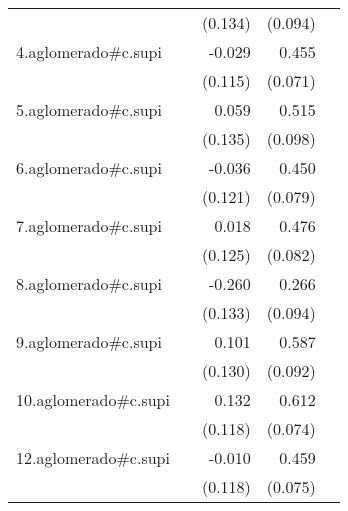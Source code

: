 {\begin{longtable}{l*{4}{D{.}{.}{-1}}}
            &                     &     (0.134)         &     (0.094)         &                     \\
\addlinespace
4.aglomerado#c.supi&                     &      -0.029         &       0.455\sym{***}&                     \\
            &                     &     (0.115)         &     (0.071)         &                     \\
\addlinespace
5.aglomerado#c.supi&                     &       0.059         &       0.515\sym{***}&                     \\
            &                     &     (0.135)         &     (0.098)         &                     \\
\addlinespace
6.aglomerado#c.supi&                     &      -0.036         &       0.450\sym{***}&                     \\
            &                     &     (0.121)         &     (0.079)         &                     \\
\addlinespace
7.aglomerado#c.supi&                     &       0.018         &       0.476\sym{***}&                     \\
            &                     &     (0.125)         &     (0.082)         &                     \\
\addlinespace
8.aglomerado#c.supi&                     &      -0.260         &       0.266\sym{**} &                     \\
            &                     &     (0.133)         &     (0.094)         &                     \\
\addlinespace
9.aglomerado#c.supi&                     &       0.101         &       0.587\sym{***}&                     \\
            &                     &     (0.130)         &     (0.092)         &                     \\
\addlinespace
10.aglomerado#c.supi&                     &       0.132         &       0.612\sym{***}&                     \\
            &                     &     (0.118)         &     (0.074)         &                     \\
\addlinespace
12.aglomerado#c.supi&                     &      -0.010         &       0.459\sym{***}&                     \\
            &                     &     (0.118)         &     (0.075)         &                     \\

\end{longtable}}
